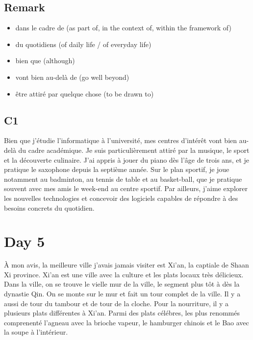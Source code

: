 \documentclass{book}
\begin{document}
    \subsection{Remark}
        \begin{itemize}
            \item dans le cadre de (as part of, in the context of, within the framework of)
            \item du quotidiens (of daily life / of everyday life)
            \item bien que (although)
            \item vont bien au-delà de (go well beyond)
            \item être attiré par quelque chose (to be drawn to)
        \end{itemize}

    \subsection{C1}
        Bien que j'étudie l'informatique à l'université, mes centres d'intérêt vont bien au-delà du cadre académique.
        Je suis particulièrement attiré par la musique, le sport et la découverte culinaire. 
        J'ai appris à jouer du piano dès l'âge de trois ans, et je pratique le saxophone depuis la septième année.
        Sur le plan sportif, je joue notamment au badminton, au tennis de table et au basket-ball, que je pratique souvent avec mes amis le week-end au centre sportif.
        Par ailleurs, j'aime explorer les nouvelles technologies et concevoir des logiciels capables de répondre à des besoins concrets du quotidien.

\section{Day 5}
    À mon avis, la meilleure ville j'avais jamais visiter est Xi'an, la captiale de Shaan Xi province.
    Xi'an est une ville avec la culture et les plats locaux très délicieux. 
    Dans la ville, on se trouve le vielle mur de la ville, le segment plus tôt à dès la dynastie Qin.
    On se monte sur le mur et fait un tour complet de la ville.
    Il y a aussi de tour du tambour et de tour de la cloche.
    Pour la nourriture, il y a plusieurs plats différentes à Xi'an. 
    Parmi des plats célébres, les plus renommés comprenenté l'agneau avec la brioche vapeur, le hamburger chinois et le Bao avec la soupe à l'intérieur.
    
\end{document}
